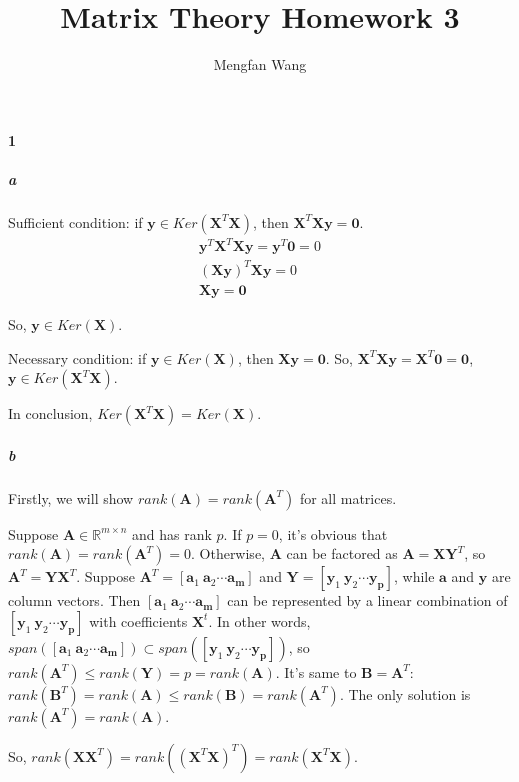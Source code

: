 \documentclass[22pt]{article}
\author{Mengfan Wang}
\title{Matrix Theory Homework 3}
\begin{document}
	\maketitle 
	\paragraph{1}
		\subparagraph{a} Sufficient condition: if $\mathbf{y} \in Ker(\mathbf{X}^T\mathbf{X})$, then $\mathbf{X}^T\mathbf{Xy} = \mathbf{0}$.
		\begin{align}
			\mathbf{y}^T\mathbf{X}^T\mathbf{Xy} = \mathbf{y}^T\mathbf{0} = 0\\
			(\mathbf{Xy})^T\mathbf{Xy} = 0\\
			\mathbf{Xy} = \mathbf{0}
		\end{align}

		So, $\mathbf{y} \in Ker(\mathbf{X})$.

		Necessary condition: if $\mathbf{y} \in Ker(\mathbf{X})$, then $\mathbf{Xy} = \mathbf{0}$.
		So, $\mathbf{X}^T\mathbf{Xy} = \mathbf{X}^T\mathbf{0} = \mathbf{0}$, $\mathbf{y} \in Ker(\mathbf{X}^T\mathbf{X})$.

		In conclusion, $Ker(\mathbf{X}^T\mathbf{X}) = Ker(\mathbf{X})$.

		\subparagraph{b}Firstly, we will show $rank(\mathbf{A}) = rank(\mathbf{A}^T)$ for all matrices. 

   		Suppose $\mathbf{A} \in \mathbb{R}^{m\times n}$ and has rank $p$. If $p=0$, it's obvious that $rank(\mathbf{A}) = rank(\mathbf{A}^T) = 0$. Otherwise, $\mathbf{A}$ can be factored as $\mathbf{A} = \mathbf{XY}^T$, so $\mathbf{A}^T = \mathbf{YX}^T$. Suppose $\mathbf{A}^T = [\mathbf{a}_1\ \mathbf{a}_2 \cdots \mathbf{a_m}]$ and $\mathbf{Y} = [\mathbf{y}_1\ \mathbf{y}_2 \cdots \mathbf{y_p}]$, while $\mathbf{a}$ and $\mathbf{y}$ are column vectors. Then $ [\mathbf{a}_1\ \mathbf{a}_2 \cdots \mathbf{a_m}]$ can be represented by a linear combination of $[\mathbf{y}_1\ \mathbf{y}_2 \cdots \mathbf{y_p}]$ with coefficients $\mathbf{X}^t$. In other words, $span([\mathbf{a}_1\ \mathbf{a}_2 \cdots \mathbf{a_m}]) \subset span([\mathbf{y}_1\ \mathbf{y}_2 \cdots \mathbf{y_p}])$, so $rank(\mathbf{A}^T) \leq rank(\mathbf{Y}) = p = rank(\mathbf{A})$. It's same to $\mathbf{B} = \mathbf{A}^T$: $rank(\mathbf{B}^T) = rank(\mathbf{A}) \leq rank(\mathbf{B}) = rank(\mathbf{A}^T)$. The only solution is $rank(\mathbf{A}^T) = rank(\mathbf{A})$.

   		So, $rank(\mathbf{XX}^T) = rank((\mathbf{X}^T\mathbf{X})^T) = rank(\mathbf{X}^T\mathbf{X})$.
\end{document}
